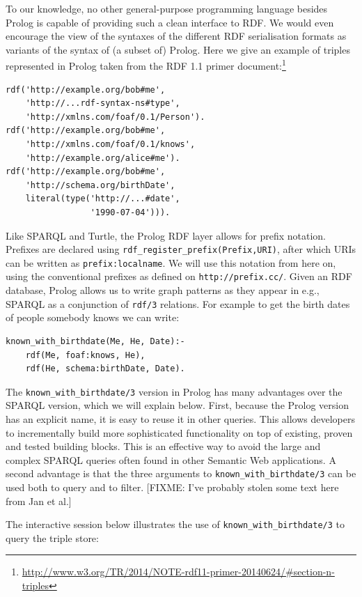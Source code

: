 \documentclass{tlp}
\begin{document}
\noindent To our knowledge, no other general-purpose programming language besides Prolog is capable of providing such a clean interface to RDF. We would even encourage the view of the syntaxes of the different RDF serialisation formats as variants of the syntax of (a subset of) Prolog. Here we give an example of triples represented in Prolog taken from the RDF 1.1 primer document:\footnote{\url{http://www.w3.org/TR/2014/NOTE-rdf11-primer-20140624/\#section-n-triples}}

\begin{lstlisting}
rdf('http://example.org/bob#me',
    'http://...rdf-syntax-ns#type',
    'http://xmlns.com/foaf/0.1/Person').
rdf('http://example.org/bob#me',
    'http://xmlns.com/foaf/0.1/knows',
    'http://example.org/alice#me').
rdf('http://example.org/bob#me',
    'http://schema.org/birthDate',
    literal(type('http://...#date',
                 '1990-07-04'))).
\end{lstlisting}

\noindent Like SPARQL and Turtle, the Prolog RDF layer allows for prefix notation. Prefixes are declared using \texttt{rdf\_register\_prefix(Prefix,URI)}, after which URIs can be written as \texttt{prefix:localname}. We will use this notation from here on, using the conventional prefixes as defined on \texttt{http://prefix.cc/}. Given an RDF database, Prolog allows us to write graph patterns as they appear in e.g., SPARQL as a conjunction of \texttt{rdf/3} relations. For example to get the birth dates of people somebody knows we can write:

\begin{lstlisting}
known_with_birthdate(Me, He, Date):-
    rdf(Me, foaf:knows, He),
    rdf(He, schema:birthDate, Date).
\end{lstlisting}

\noindent The \texttt{known\_with\_birthdate/3} version in Prolog has many advantages over the SPARQL version, which we will explain below. First, because the Prolog version has an explicit name, it is easy to reuse it in other queries. This allows developers to incrementally build more sophisticated functionality on top of existing, proven and tested building blocks. This is an effective way to avoid the large and complex SPARQL queries often found in other Semantic Web applications. A second advantage is that the three arguments to \texttt{known\_with\_birthdate/3} can be used both to query and to filter. [FIXME: I've probably stolen some text here from Jan et al.]

The interactive session below illustrates the use of \texttt{known\_with\_birthdate/3} to query the triple store:
\end{document}
